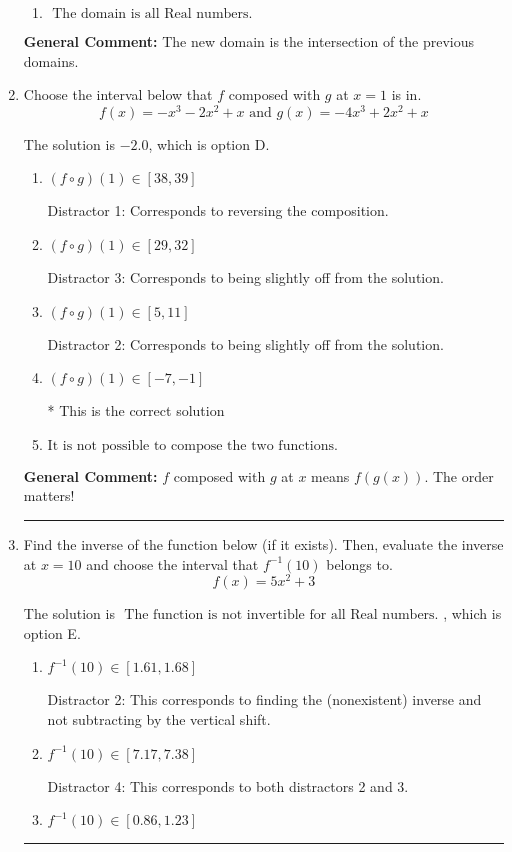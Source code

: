 \documentclass{extbook}[14pt]
\newcommand{\litem}[1]{\item #1

\rule{\textwidth}{0.4pt}}
\begin{document}
\begin{enumerate}
{\begin{enumerate}[label=\Alph*.]
\item \( \text{ The domain is all Real numbers. } \)


\end{enumerate}

\textbf{General Comment:} The new domain is the intersection of the previous domains.
}
\litem{
Choose the interval below that $f$ composed with $g$ at $x=1$ is in.
\[ f(x) = -x^{3} -2 x^{2} +x \text{ and } g(x) = -4x^{3} +2 x^{2} +x \]

The solution is \( -2.0 \), which is option D.\begin{enumerate}[label=\Alph*.]
\item \( (f \circ g)(1) \in [38, 39] \)

 Distractor 1: Corresponds to reversing the composition.
\item \( (f \circ g)(1) \in [29, 32] \)

 Distractor 3: Corresponds to being slightly off from the solution.
\item \( (f \circ g)(1) \in [5, 11] \)

 Distractor 2: Corresponds to being slightly off from the solution.
\item \( (f \circ g)(1) \in [-7, -1] \)

* This is the correct solution
\item \( \text{It is not possible to compose the two functions.} \)


\end{enumerate}

\textbf{General Comment:} $f$ composed with $g$ at $x$ means $f(g(x))$. The order matters!
}
\litem{
Find the inverse of the function below (if it exists). Then, evaluate the inverse at $x = 10$ and choose the interval that $f^{-1}(10)$ belongs to.
\[ f(x) = 5 x^2 + 3 \]

The solution is \( \text{ The function is not invertible for all Real numbers. } \), which is option E.\begin{enumerate}[label=\Alph*.]
\item \( f^{-1}(10) \in [1.61, 1.68] \)

 Distractor 2: This corresponds to finding the (nonexistent) inverse and not subtracting by the vertical shift.
\item \( f^{-1}(10) \in [7.17, 7.38] \)

 Distractor 4: This corresponds to both distractors 2 and 3.
\item \( f^{-1}(10) \in [0.86, 1.23] \)


\end{enumerate}}
\end{enumerate}
\end{document}
